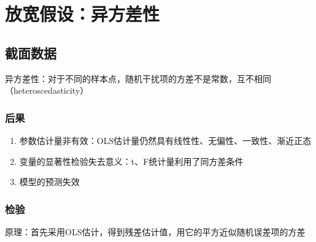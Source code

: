 \documentclass[12pt]{book}
\begin{document}
\section{放宽假设：异方差性}


\subsection{截面数据}







异方差性：对于不同的样本点，随机干扰项的方差不是常数，互不相同（heteroscedasticity）


\subsubsection{后果}

\begin{enumerate}[1.]
    \item 参数估计量非有效：OLS估计量仍然具有线性性、无偏性、一致性、渐近正态
    \item 变量的显著性检验失去意义：t、F统计量利用了同方差条件
    \item 模型的预测失效
\end{enumerate}


\subsubsection{检验}

原理：首先采用OLS估计，得到残差估计值，用它的平方近似随机误差项的方差
\end{document}

